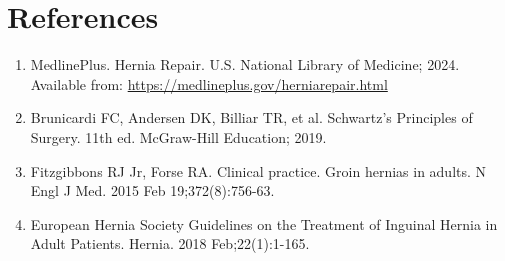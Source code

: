 \section*{References}
\begin{enumerate}
  \item MedlinePlus. Hernia Repair. U.S. National Library of Medicine; 2024. Available from: \url{https://medlineplus.gov/herniarepair.html}
  
  \item Brunicardi FC, Andersen DK, Billiar TR, et al. Schwartz's Principles of Surgery. 11th ed. McGraw-Hill Education; 2019.
  
  \item Fitzgibbons RJ Jr, Forse RA. Clinical practice. Groin hernias in adults. N Engl J Med. 2015 Feb 19;372(8):756-63.
  
  \item European Hernia Society Guidelines on the Treatment of Inguinal Hernia in Adult Patients. Hernia. 2018 Feb;22(1):1-165.
\end{enumerate}

\clearpage
